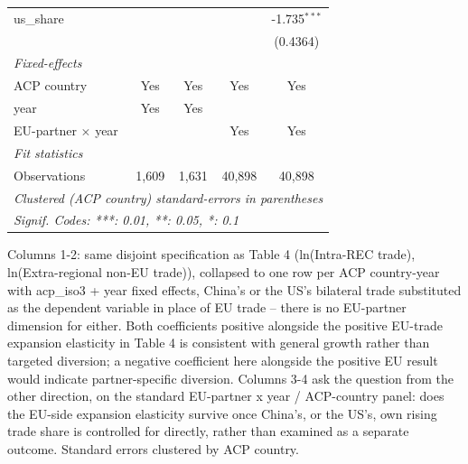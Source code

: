 \begin{tabular}{lcccc}
   us\_share                       &                &                &                                & -1.735$^{***}$\\   
                                   &                &                &                                & (0.4364)\\   
   \midrule
   \emph{Fixed-effects}\\
   ACP country                     & Yes            & Yes            & Yes                            & Yes\\  
   year                            & Yes            & Yes            &                                & \\  
   EU-partner $\times$ year        &                &                & Yes                            & Yes\\  
   \midrule
   \emph{Fit statistics}\\
   Observations                    & 1,609          & 1,631          & 40,898                         & 40,898\\  
   \midrule \midrule
   \multicolumn{5}{l}{\emph{Clustered (ACP country) standard-errors in parentheses}}\\
   \multicolumn{5}{l}{\emph{Signif. Codes: ***: 0.01, **: 0.05, *: 0.1}}\\
\end{tabular}
 
\par \raggedright 
Columns 1-2: same disjoint specification as Table 4 (ln(Intra-REC trade), ln(Extra-regional non-EU trade)), collapsed to one row per ACP country-year with acp\_iso3 + year fixed effects, China's or the US's bilateral trade substituted as the dependent variable in place of EU trade -- there is no EU-partner dimension for either. Both coefficients positive alongside the positive EU-trade expansion elasticity in Table 4 is consistent with general growth rather than targeted diversion; a negative coefficient here alongside the positive EU result would indicate partner-specific diversion. Columns 3-4 ask the question from the other direction, on the standard EU-partner x year / ACP-country panel: does the EU-side expansion elasticity survive once China's, or the US's, own rising trade share is controlled for directly, rather than examined as a separate outcome. Standard errors clustered by ACP country.
\par\endgroup


